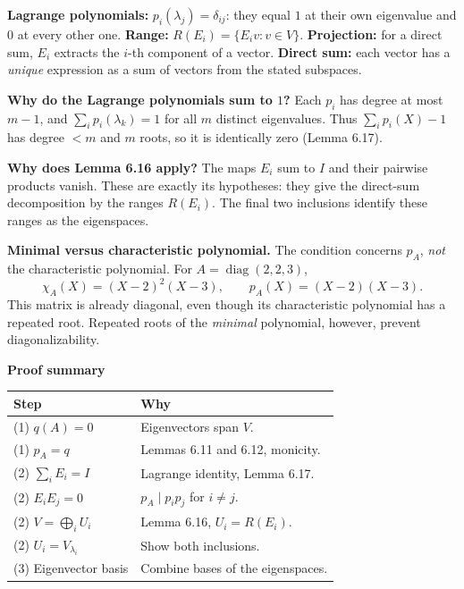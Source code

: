 \documentclass[11pt,a4paper]{article}
\newcommand{\prooftable}[1]{\medskip\textbf{Proof summary}\par\smallskip #1\medskip}
\begin{document}
\begin{personalnote}[title=Definitions for understanding]
\textbf{Lagrange polynomials:} \(p_i(\lambda_j)=\delta_{ij}\):
they equal \(1\) at their own eigenvalue and \(0\) at every other one.
\textbf{Range:} \(R(E_i)=\{E_iv:v\in V\}\).
\textbf{Projection:} for a direct sum, \(E_i\) extracts the \(i\)-th
component of a vector.
\textbf{Direct sum:} each vector has a \emph{unique} expression
as a sum of vectors from the stated subspaces.
\end{personalnote}

\begin{personalnote}
\textbf{Why do the Lagrange polynomials sum to \(1\)?}
Each \(p_i\) has degree at most \(m-1\), and
\(\sum_i p_i(\lambda_k)=1\) for all \(m\) distinct eigenvalues.
Thus \(\sum_i p_i(X)-1\) has degree \(<m\) and \(m\) roots,
so it is identically zero (Lemma 6.17).

\textbf{Why does Lemma 6.16 apply?} The maps \(E_i\) sum to \(I\)
and their pairwise products vanish. These are exactly its hypotheses:
they give the direct-sum decomposition by the ranges \(R(E_i)\).
The final two inclusions identify these ranges as the eigenspaces.
\end{personalnote}

\begin{personalnote}
\textbf{Minimal versus characteristic polynomial.}
The condition concerns \(p_A\), \emph{not} the characteristic polynomial.
For \(A=\operatorname{diag}(2,2,3)\),
\[
\chi_A(X)=(X-2)^2(X-3),\qquad
p_A(X)=(X-2)(X-3).
\]
This matrix is already diagonal, even though its characteristic polynomial
has a repeated root. Repeated roots of the \emph{minimal} polynomial,
however, prevent diagonalizability.
\end{personalnote}

\prooftable{\begin{tabularx}{\linewidth}{@{}p{.29\linewidth}X@{}}\hline
Step & Why\\\hline
(1) \(q(A)=0\) & Eigenvectors span \(V\).\\
(1) \(p_A=q\) & Lemmas 6.11 and 6.12, monicity.\\
(2) \(\sum_i E_i=I\) & Lagrange identity, Lemma 6.17.\\
(2) \(E_iE_j=0\) & \(p_A\mid p_ip_j\) for \(i\neq j\).\\
(2) \(V=\bigoplus_i U_i\) & Lemma 6.16, \(U_i=R(E_i)\).\\
(2) \(U_i=V_{\lambda_i}\) & Show both inclusions.\\
(3) Eigenvector basis & Combine bases of the eigenspaces.\\\hline
\end{tabularx}}
\end{document}
